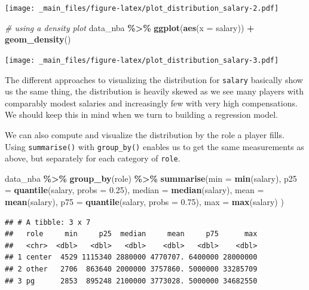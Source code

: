 \documentclass[
]{book}
\newenvironment{Shaded}{\begin{snugshade}}{\end{snugshade}}
\newcommand{\AttributeTok}[1]{\textcolor[rgb]{0.13,0.29,0.53}{#1}}
\newcommand{\CommentTok}[1]{\textcolor[rgb]{0.56,0.35,0.01}{\textit{#1}}}
\newcommand{\FloatTok}[1]{\textcolor[rgb]{0.00,0.00,0.81}{#1}}
\newcommand{\FunctionTok}[1]{\textcolor[rgb]{0.13,0.29,0.53}{\textbf{#1}}}
\newcommand{\NormalTok}[1]{#1}
\newcommand{\SpecialCharTok}[1]{\textcolor[rgb]{0.81,0.36,0.00}{\textbf{#1}}}
\begin{document}
\texttt{[image: \_main\_files/figure-latex/plot\_distribution\_salary-2.pdf]}

\begin{Shaded}
\begin{Highlighting}[]
\CommentTok{\# using a density plot}
\NormalTok{data\_nba }\SpecialCharTok{\%\textgreater{}\%}
  \FunctionTok{ggplot}\NormalTok{(}\FunctionTok{aes}\NormalTok{(}\AttributeTok{x =}\NormalTok{ salary)) }\SpecialCharTok{+}
  \FunctionTok{geom\_density}\NormalTok{()}
\end{Highlighting}
\end{Shaded}

\texttt{[image: \_main\_files/figure-latex/plot\_distribution\_salary-3.pdf]}

The different approaches to visualizing the distribution for \texttt{salary} basically show us the same thing, the distribution is heavily skewed as we see many players with comparably modest salaries and increasingly few with very high compensations. We should keep this in mind when we turn to building a regression model.

We can also compute and visualize the distribution by the role a player fills. Using \texttt{summarise()} with \texttt{group\_by()} enables us to get the same measurements as above, but separately for each category of \texttt{role}.

\begin{Shaded}
\begin{Highlighting}[]
\NormalTok{data\_nba }\SpecialCharTok{\%\textgreater{}\%} 
  \FunctionTok{group\_by}\NormalTok{(role) }\SpecialCharTok{\%\textgreater{}\%} 
  \FunctionTok{summarise}\NormalTok{(}\AttributeTok{min =} \FunctionTok{min}\NormalTok{(salary),}
            \AttributeTok{p25 =} \FunctionTok{quantile}\NormalTok{(salary, }\AttributeTok{probs =} \FloatTok{0.25}\NormalTok{),}
            \AttributeTok{median =} \FunctionTok{median}\NormalTok{(salary),}
            \AttributeTok{mean =} \FunctionTok{mean}\NormalTok{(salary),}
            \AttributeTok{p75 =} \FunctionTok{quantile}\NormalTok{(salary, }\AttributeTok{probs =} \FloatTok{0.75}\NormalTok{),}
            \AttributeTok{max =} \FunctionTok{max}\NormalTok{(salary)}
\NormalTok{            )}
\end{Highlighting}
\end{Shaded}

\begin{verbatim}
## # A tibble: 3 x 7
##   role     min     p25  median     mean     p75      max
##   <chr>  <dbl>   <dbl>   <dbl>    <dbl>   <dbl>    <dbl>
## 1 center  4529 1115340 2880000 4770707. 6400000 28000000
## 2 other   2706  863640 2000000 3757860. 5000000 33285709
## 3 pg      2853  895248 2100000 3773028. 5000000 34682550
\end{verbatim}
\end{document}
